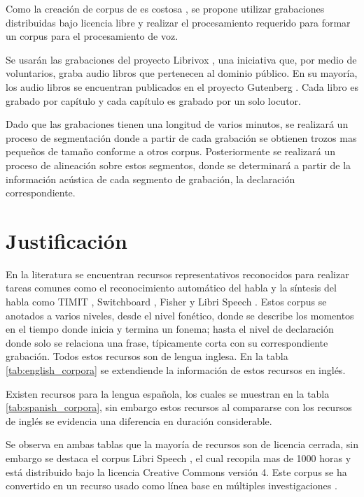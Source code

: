 Como la creación de corpus de es costosa \cite{googleTTSLatinAmericanSpanishCorpus}, se propone utilizar grabaciones distribuidas bajo licencia libre y realizar el procesamiento requerido para formar un corpus para el procesamiento de voz.

Se usarán las grabaciones del proyecto Librivox \cite{LibriVox}, una iniciativa que, por medio de voluntarios, graba audio libros que pertenecen al dominio público. En su mayoría, los audio libros se encuentran publicados en el proyecto Gutenberg \cite{gutenberg}. Cada libro es grabado por capítulo y cada capítulo es grabado por un solo locutor.

Dado que las grabaciones tienen una longitud de varios minutos, se realizará un proceso de segmentación donde a partir de cada grabación se obtienen trozos mas pequeños de tamaño conforme a otros corpus. Posteriormente se realizará un proceso de alineación sobre estos segmentos, donde se determinará a partir de la información acústica de cada segmento de grabación, la declaración correspondiente.


\section{Justificación}

En la literatura se encuentran recursos representativos reconocidos para realizar tareas comunes como el reconocimiento automático del habla y la síntesis del habla como TIMIT \cite{PriceTheRecognition}, Switchboard \cite{Godfrey1992SWITCHBOARD:Development}, Fisher \cite{CieriTheSpeech-to-Text} y Libri Speech \cite{PanayotovLIBRISPEECH:BOOKS}. Estos corpus se anotados a varios niveles, desde el nivel fonético, donde se describe los momentos en el tiempo donde inicia y termina un fonema; hasta el nivel de declaración donde solo se relaciona una frase, típicamente corta con su correspondiente grabación. Todos estos recursos son de lengua inglesa. En la tabla \ref{tab:english_corpora} se extendiende la información de estos recursos en inglés.



Existen recursos para la lengua española, los cuales se muestran en la tabla \ref{tab:spanish_corpora}, sin embargo estos recursos al compararse con los recursos de inglés se evidencia una diferencia en duración considerable.



Se observa en ambas tablas que la mayoría de recursos son de licencia cerrada, sin embargo se destaca el corpus Libri Speech \cite{LIBRISPEECH}, el cual recopila mas de 1000 horas y está distribuido bajo la licencia Creative Commons versión 4. Este corpus se ha convertido en un recurso usado como línea base en múltiples investigaciones \cite{libribox_benchmark1,librilight,libribox_benchmark3}. 

